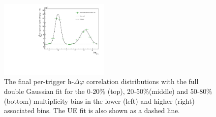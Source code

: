 \begin{figure}[ht]
    \includegraphics[width=0.48\textwidth]{figures/analysis/h_lambda_dphi_gaus_50_80_highpt.pdf}
    \caption{The final per-trigger h-\lmb $\Delta\varphi$ correlation distributions with the full double Gaussian fit for the 0-20\% (top), 20-50\%(middle) and 50-80\% (bottom) multiplicity bins in the lower (left) and higher (right) associated \pt bins. The UE fit is also shown as a dashed line.}
    \label{fig:double_gaus_fits_lambda}
\end{figure}
